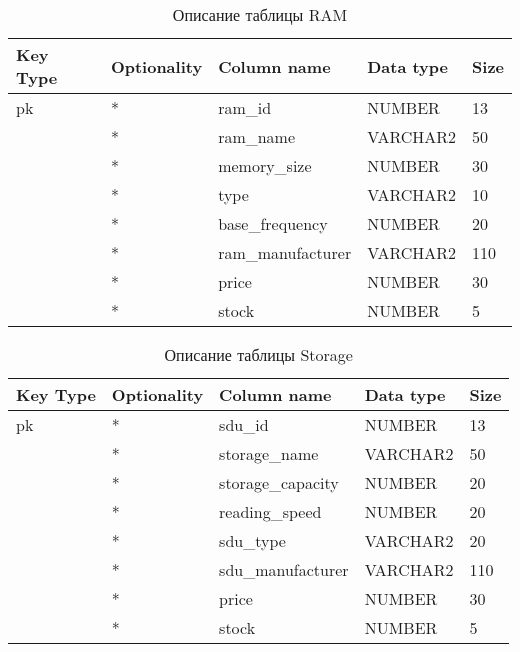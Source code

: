 \begin{xltabular}{\textwidth}{|X|X|p{4.0cm}|X|X|}
	\caption{Описание таблицы RAM\label{tab:ram}}\\
	\hline
	Key Type & Optionality & Column name & Data type & Size \\ \hline
	pk & * & ram\_id & NUMBER & 13 \\ \hline
	& * & ram\_name & VARCHAR2 & 50 \\ \hline
	& * & memory\_size & NUMBER & 30 \\ \hline
	& * & type & VARCHAR2 & 10 \\ \hline
	& * & base\_frequency & NUMBER & 20 \\ \hline
	& * & ram\_manufacturer & VARCHAR2 & 110 \\ \hline
	& * & price & NUMBER & 30 \\ \hline
	& * & stock & NUMBER & 5 \\ \hline
\end{xltabular}

\begin{xltabular}{\textwidth}{|X|X|p{4.0cm}|X|X|}
	\caption{Описание таблицы Storage\label{tab:storage}}\\
	\hline
	Key Type & Optionality & Column name & Data type & Size \\ \hline
	pk & * & sdu\_id & NUMBER & 13 \\ \hline
	& * & storage\_name & VARCHAR2 & 50 \\ \hline
	& * & storage\_capacity & NUMBER & 20 \\ \hline
	& * & reading\_speed & NUMBER & 20 \\ \hline
	& * & sdu\_type & VARCHAR2 & 20 \\ \hline
	& * & sdu\_manufacturer & VARCHAR2 & 110 \\ \hline
	& * & price & NUMBER & 30 \\ \hline
	& * & stock & NUMBER & 5 \\ \hline
\end{xltabular}

